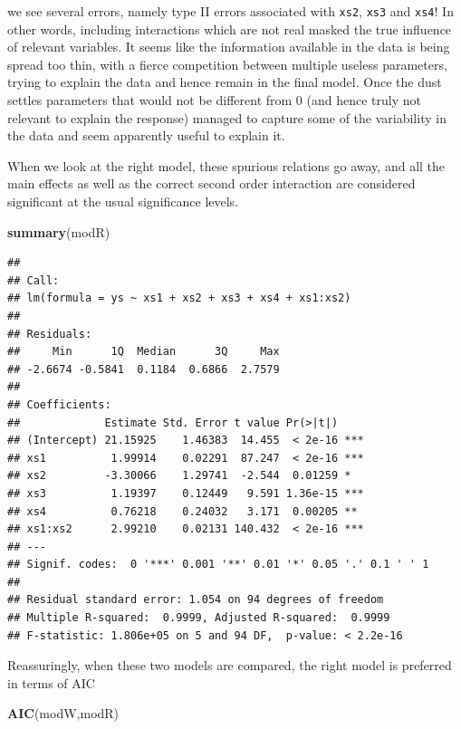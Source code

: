 \documentclass[
]{book}
\newenvironment{Shaded}{\begin{snugshade}}{\end{snugshade}}
\newcommand{\FunctionTok}[1]{\textcolor[rgb]{0.13,0.29,0.53}{\textbf{#1}}}
\newcommand{\NormalTok}[1]{#1}
\begin{document}
we see several errors, namely type II errors associated with \texttt{xs2}, \texttt{xs3} and \texttt{xs4}! In other words, including interactions which are not real masked the true influence of relevant variables. It seems like the information available in the data is being spread too thin, with a fierce competition between multiple useless parameters, trying to explain the data and hence remain in the final model. Once the dust settles parameters that would not be different from 0 (and hence truly not relevant to explain the response) managed to capture some of the variability in the data and seem apparently useful to explain it.

When we look at the right model, these spurious relations go away, and all the main effects as well as the correct second order interaction are considered significant at the usual significance levels.

\begin{Shaded}
\begin{Highlighting}[]
\FunctionTok{summary}\NormalTok{(modR)}
\end{Highlighting}
\end{Shaded}

\begin{verbatim}
## 
## Call:
## lm(formula = ys ~ xs1 + xs2 + xs3 + xs4 + xs1:xs2)
## 
## Residuals:
##     Min      1Q  Median      3Q     Max 
## -2.6674 -0.5841  0.1184  0.6866  2.7579 
## 
## Coefficients:
##             Estimate Std. Error t value Pr(>|t|)    
## (Intercept) 21.15925    1.46383  14.455  < 2e-16 ***
## xs1          1.99914    0.02291  87.247  < 2e-16 ***
## xs2         -3.30066    1.29741  -2.544  0.01259 *  
## xs3          1.19397    0.12449   9.591 1.36e-15 ***
## xs4          0.76218    0.24032   3.171  0.00205 ** 
## xs1:xs2      2.99210    0.02131 140.432  < 2e-16 ***
## ---
## Signif. codes:  0 '***' 0.001 '**' 0.01 '*' 0.05 '.' 0.1 ' ' 1
## 
## Residual standard error: 1.054 on 94 degrees of freedom
## Multiple R-squared:  0.9999, Adjusted R-squared:  0.9999 
## F-statistic: 1.806e+05 on 5 and 94 DF,  p-value: < 2.2e-16
\end{verbatim}

Reassuringly, when these two models are compared, the right model is preferred in terms of AIC

\begin{Shaded}
\begin{Highlighting}[]
\FunctionTok{AIC}\NormalTok{(modW,modR)}
\end{Highlighting}
\end{Shaded}
\end{document}
